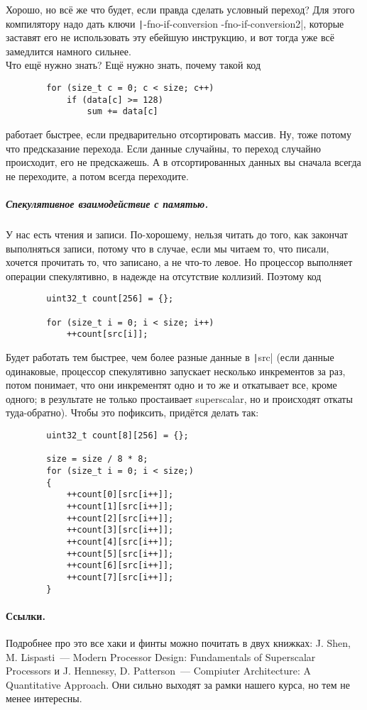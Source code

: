 \documentclass{article}
\begin{document}
    Хорошо, но всё же что будет, если правда сделать условный переход? Для этого компилятору надо дать ключи \texttt|-fno-if-conversion -fno-if-conversion2|, которые заставят его не использовать эту ебейшую инструкцию, и вот тогда уже всё замедлится намного сильнее.\\
    Что ещё нужно знать? Ещё нужно знать, почему такой код
    \begin{verbatim}
        for (size_t c = 0; c < size; c++)
            if (data[c] >= 128)
                sum += data[c]
    \end{verbatim}
    работает быстрее, если предварительно отсортировать массив. Ну, тоже потому что предсказание перехода. Если данные случайны, то переход случайно происходит, его не предскажешь. А в отсортированных данных вы сначала всегда не переходите, а потом всегда переходите.
    \subparagraph{Спекулятивное взаимодействие с памятью.}
    У нас есть чтения и записи. По-хорошему, нельзя читать до того, как закончат выполняться записи, потому что в случае, если мы читаем то, что писали, хочется прочитать то, что записано, а не что-то левое. Но процессор выполняет операции спекулятивно, в надежде на отсутствие коллизий. Поэтому код
    \begin{verbatim}
        uint32_t count[256] = {};
        
        for (size_t i = 0; i < size; i++)
            ++count[src[i]];
    \end{verbatim}
    Будет работать тем быстрее, чем более разные данные в \texttt|src| (если данные одинаковые, процессор спекулятивно запускает несколько инкрементов за раз, потом понимает, что они инкрементят одно и то же и откатывает все, кроме одного; в результате не только простаивает superscalar, но и происходят откаты туда-обратно). Чтобы это пофиксить, придётся делать так:
    \begin{verbatim}
        uint32_t count[8][256] = {};
        
        size = size / 8 * 8;
        for (size_t i = 0; i < size;)
        {
            ++count[0][src[i++]];
            ++count[1][src[i++]];
            ++count[2][src[i++]];
            ++count[3][src[i++]];
            ++count[4][src[i++]];
            ++count[5][src[i++]];
            ++count[6][src[i++]];
            ++count[7][src[i++]];
        }
    \end{verbatim}
    \paragraph{Ссылки.}
    Подробнее про это все хаки и финты можно почитать в двух книжках: J. Shen, M. Lispasti~--- Modern Processor Design: Fundamentals of Superscalar Processors и J. Hennessy, D. Patterson~--- Compiuter Architecture: A Quantitative Approach. Они сильно выходят за рамки нашего курса, но тем не менее интересны.
\end{document}
